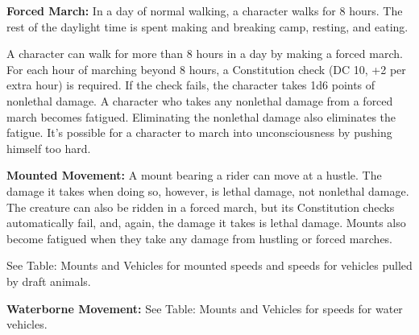 \textbf{Forced March:} In a day of normal walking, a character walks for 8 hours. The rest of the daylight time is spent making and breaking camp, resting, and eating.

A character can walk for more than 8 hours in a day by making a forced march. For each hour of marching beyond 8 hours, a Constitution check (DC 10, +2 per extra hour) is required. If the check fails, the character takes 1d6 points of nonlethal damage. A character who takes any nonlethal damage from a forced march becomes fatigued. Eliminating the nonlethal damage also eliminates the fatigue. It's possible for a character to march into unconsciousness by pushing himself too hard.

\textbf{Mounted Movement:} A mount bearing a rider can move at a hustle. The damage it takes when doing so, however, is lethal damage, not nonlethal damage. The creature can also be ridden in a forced march, but its Constitution checks automatically fail, and, again, the damage it takes is lethal damage. Mounts also become fatigued when they take any damage from hustling or forced marches.

See Table: Mounts and Vehicles for mounted speeds and speeds for vehicles pulled by draft animals.

\textbf{Waterborne Movement:} See Table: Mounts and Vehicles for speeds for water vehicles.

